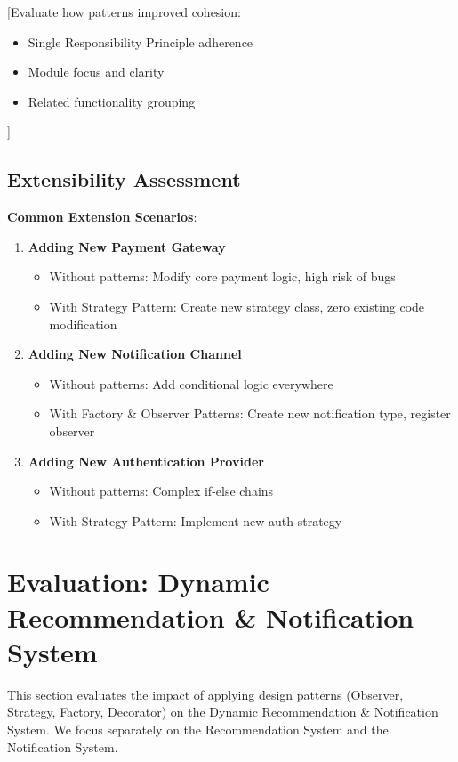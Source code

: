 \documentclass[a4paper,12pt]{report}
\begin{document}
[Evaluate how patterns improved cohesion:
\begin{itemize}
    \item Single Responsibility Principle adherence
    \item Module focus and clarity
    \item Related functionality grouping
\end{itemize}]

\subsection{Extensibility Assessment}

\textbf{Common Extension Scenarios}:

\begin{enumerate}
    \item \textbf{Adding New Payment Gateway}
    \begin{itemize}
        \item Without patterns: Modify core payment logic, high risk of bugs
        \item With Strategy Pattern: Create new strategy class, zero existing code modification
    \end{itemize}
    
    \item \textbf{Adding New Notification Channel}
    \begin{itemize}
        \item Without patterns: Add conditional logic everywhere
        \item With Factory \& Observer Patterns: Create new notification type, register observer
    \end{itemize}
    
    \item \textbf{Adding New Authentication Provider}
    \begin{itemize}
        \item Without patterns: Complex if-else chains
        \item With Strategy Pattern: Implement new auth strategy
    \end{itemize}
\end{enumerate}


\section{Evaluation: Dynamic Recommendation \& Notification System}

This section evaluates the impact of applying design patterns (Observer, Strategy, Factory, Decorator) on the Dynamic Recommendation \& Notification System. We focus separately on the Recommendation System and the Notification System.
\end{document}
